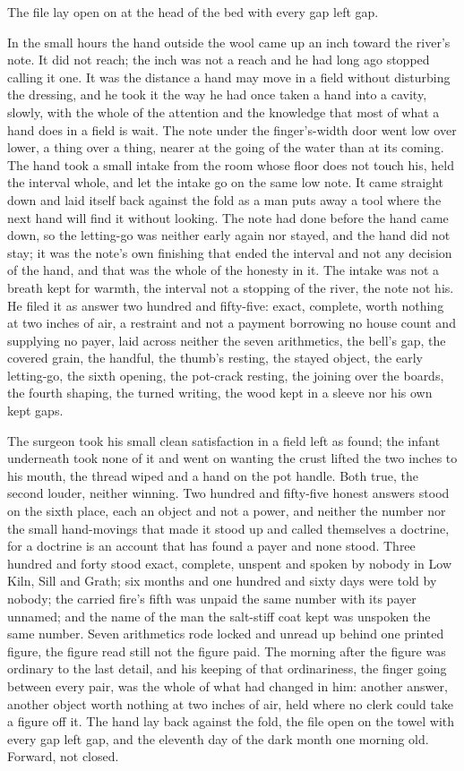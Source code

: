 The file lay open on  at the head of the bed with every gap left gap.

\scenebreak

In the small hours the hand outside the wool came up an inch toward the river's note. It did not reach; the inch was not a reach and he had long ago stopped calling it one. It was the distance a hand may move in a field without disturbing the dressing, and he took it the way he had once taken a hand into a cavity, slowly, with the whole of the attention and the knowledge that most of what a hand does in a field is wait. The note under the finger's-width door went low over lower, a thing over a thing, nearer at the going of the water than at its coming. The hand took a small intake from the room whose floor does not touch his, held the interval whole, and let the intake go on the same low note. It came straight down and laid itself back against the fold as a man puts away a tool where the next hand will find it without looking. The note had done before the hand came down, so the letting-go was neither early again nor stayed, and the hand did not stay; it was the note's own finishing that ended the interval and not any decision of the hand, and that was the whole of the honesty in it. The intake was not a breath kept for warmth, the interval not a stopping of the river, the note not his. He filed it as answer two hundred and fifty-five: exact, complete, worth nothing at two inches of air, a restraint and not a payment borrowing no house count and supplying no payer, laid across neither the seven arithmetics, the bell's gap, the covered grain, the handful, the thumb's resting, the stayed object, the early letting-go, the sixth opening, the pot-crack resting, the joining over the boards, the fourth shaping, the turned writing, the wood kept in a sleeve nor his own kept gaps.

The surgeon took his small clean satisfaction in a field left as found; the infant underneath took none of it and went on wanting the crust lifted the two inches to his mouth, the thread wiped and a hand on the pot handle. Both true, the second louder, neither winning. Two hundred and fifty-five honest answers stood on the sixth place, each an object and not a power, and neither the number nor the small hand-movings that made it stood up and called themselves a doctrine, for a doctrine is an account that has found a payer and none stood. Three hundred and forty stood exact, complete, unspent and spoken by nobody in Low Kiln, Sill and Grath; six months and one hundred and sixty days were told by nobody; the carried fire's fifth was unpaid the same number with its payer unnamed; and the name of the man the salt-stiff coat kept was unspoken the same number. Seven arithmetics rode locked and unread up  behind one printed figure, the figure read still not the figure paid. The morning after the figure was ordinary to the last detail, and his keeping of that ordinariness, the finger going between every pair, was the whole of what had changed in him: another answer, another object worth nothing at two inches of air, held where no clerk could take a figure off it. The hand lay back against the fold, the file open on the towel with every gap left gap, and the eleventh day of the dark month one morning old. Forward, not closed.
